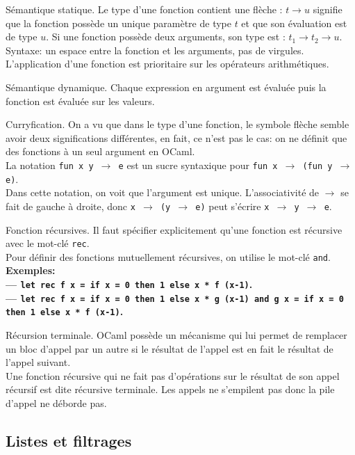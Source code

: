 \documentclass[french, 11pt]{article}
\begin{document}
\begin{defi}{Sémantique statique.}{}
    Le type d'une fonction contient une flèche : $t \to u$ signifie que la fonction possède un unique paramètre de type $t$ et que son évaluation est de type $u$.\n
    Si une fonction possède deux arguments, son type est : $t_1\to t_2 \to u$.\n
    Syntaxe: un espace entre la fonction et les arguments, pas de virgules.\n
    L'application d'une fonction est prioritaire sur les opérateurs arithmétiques.
\end{defi}

\begin{defi}{Sémantique dynamique.}{}
    Chaque expression en argument est évaluée puis la fonction est évaluée sur les valeurs.
\end{defi}

\begin{defi}{Curryfication.}{}
    On a vu que dans le type d'une fonction, le symbole flèche semble avoir deux significations différentes, en fait, ce n'est pas le cas: on ne définit que des fonctions à un seul argument en OCaml.\\
    La notation \texttt{fun x y $\to$ e} est un sucre syntaxique pour \texttt{fun x $\to$ (fun y $\to$ e)}.\\
    Dans cette notation, on voit que l'argument est unique.\n
    L'associativité de $\to$ se fait de gauche à droite, donc \texttt{x $\to$ (y $\to$ e)} peut s'écrire \texttt{x $\to$ y $\to$ e}.
\end{defi}

\begin{defi}{Fonction récursives.}{}
    Il faut spécifier explicitement qu'une fonction est récursive avec le mot-clé \texttt{rec}.\\
    Pour définir des fonctions mutuellement récursives, on utilise le mot-clé \texttt{and}.\\
    \bf{Exemples:}\\
    --- \texttt{let rec f x = if x = 0 then 1 else x * f (x-1)}.\\
    --- \texttt{let rec f x = if x = 0 then 1 else x * g (x-1) and g x = if x = 0 then 1 else x * f (x-1)}.
\end{defi}

\begin{defi}{Récursion terminale.}{}
    OCaml possède un mécanisme qui lui permet de remplacer un bloc d'appel par un autre si le résultat de l'appel est en fait le résultat de l'appel suivant.\\
    Une fonction récursive qui ne fait pas d'opérations sur le résultat de son appel récursif est dite récursive terminale. Les appels ne s'empilent pas donc la pile d'appel ne déborde pas.
\end{defi}

\subsection{Listes et filtrages}
\end{document}
